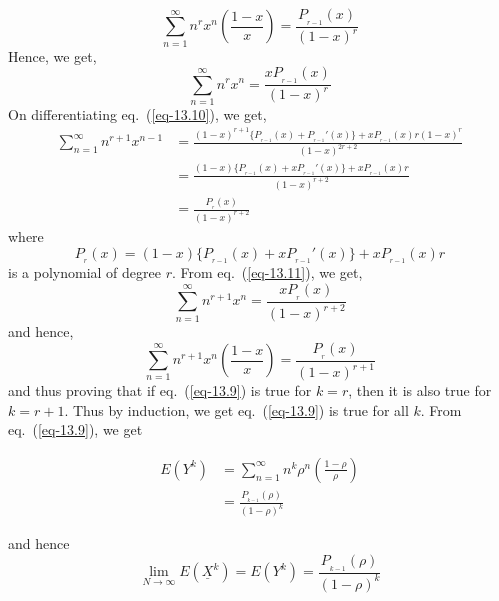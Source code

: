\begin{multicols}{2}
\begin{equation}\nonumber
\displaystyle{\sum_{n=1}^{\infty}}n^r x^n \left(\frac{1-x}{x}\right) = \displaystyle{\frac{P_{_{r-1}}(x)}{(1-x)^r}}
\end{equation}
Hence, we get,
\begin{equation}
\displaystyle{\sum_{n=1}^{\infty}}n^r x^n = \frac{xP_{_{r-1}}(x)}{(1-x)^r}\label{eq-13.10}
\end{equation}
On differentiating eq.~(\ref{eq-13.10}), we get,
{\fontsize{8}{9}\selectfont\begin{align}
\displaystyle{\sum_{n=1}^{\infty}}n^{r+1}x^{n-1} &= \frac{(1-x)^{r+1}\{P_{_{r-1}}(x)+P_{_{r-1}}'(x)\}+ xP_{_{r-1}}(x)r(1-x)^r}{(1-x)^{2r+2}}\nonumber\\
&= \frac{(1-x)\{P_{_{r-1}}(x) + xP_{_{r-1}}'(x)\}+ xP_{_{r-1}}(x)r}{(1-x)^{r+2}}\nonumber\\
&= \frac{P_{_r}(x)}{(1-x)^{r+2}}\label{eq-13.11}
\end{align}}
where 
\begin{equation}
P_{_r}(x) = (1-x)\{P_{_{r-1}}(x) + xP_{_{r-1}}'(x)\} + xP_{_{r-1}}(x)r\label{eq-13.12}
\end{equation}
is a polynomial of degree $r$. From eq.~(\ref{eq-13.11}), we get,
\begin{equation}\nonumber
\displaystyle{\sum_{n=1}^{\infty}}n^{r+1}x^n = \frac{xP_{_r}(x)}{(1-x)^{r+2}}
\end{equation}
and hence,
\begin{equation}\nonumber
\displaystyle{\sum_{n=1}^{\infty}}n^{r+1}x^n\left(\frac{1-x}{x}\right) = \frac{P_{_r}(x)}{(1-x)^{r+1}}
\end{equation}
and thus proving that if eq.~(\ref{eq-13.9}) is true for $k = r$, then it is also true for $k = r+1$. Thus by induction, we get eq.~(\ref{eq-13.9}) is true for all $k$.
From eq.~(\ref{eq-13.9}), we get

\vspace{-1cm}

\begin{align}
E(Y^k) &= \displaystyle{\sum_{n=1}^{\infty}}n^k \rho^n \left(\frac{1-\rho}{\rho}\right)\nonumber\\
       &= \frac{P_{_{k-1}}(\rho)}{(1-\rho)^{k}}\nonumber
\end{align}

\vspace{-.8cm}

and hence
\begin{equation}
\label{eq-13.13}
\displaystyle{\lim_{N \rightarrow \infty}}E(\underline{X}^k) = E(Y^k) = \displaystyle{\frac{P_{_{k-1}}(\rho)}{(1-\rho)^k}}
\end{equation}


\end{multicols}
